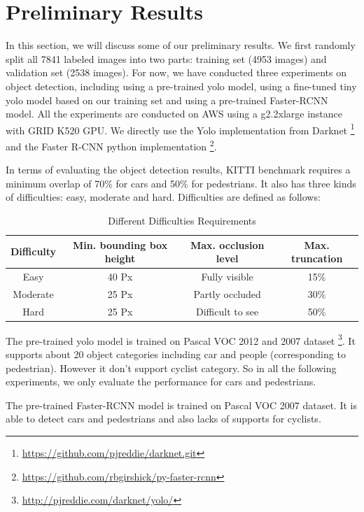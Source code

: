 \section{Preliminary Results}

In this section, we will discuss some of our preliminary results. 
We first randomly split all 7841 labeled images into two parts: 
training set (4953 images) and validation set (2538 images). 
For now, we have conducted three experiments on object detection, including using a pre-trained yolo model, using a fine-tuned tiny yolo model based on our training set and using a pre-trained Faster-RCNN model. All the experiments are conducted on AWS using a g2.2xlarge instance with GRID K520 GPU. We directly use the Yolo implementation from Darknet \footnote{\url{https://github.com/pjreddie/darknet.git}} and the Faster R-CNN python implementation \footnote{\url{https://github.com/rbgirshick/py-faster-rcnn}}.

In terms of evaluating the object detection results, KITTI benchmark requires a minimum overlap of 70\% for cars and 50\% for pedestrians. It also has three kinds of difficulties: easy, moderate and hard. Difficulties are defined as follows:

\begin{table}[h!]
\centering
\begin{tabular}{ c | c | c | c }
\hline
Difficulty & Min. bounding box height & Max. occlusion level & Max. truncation \\
\hline \hline
Easy & 40 Px & Fully visible & 15\% \\
Moderate & 25 Px & Partly occluded & 30\% \\
Hard & 25 Px & Difficult to see & 50\% \\
\hline
\end{tabular}
\caption{Different Difficulties Requirements}
\end{table}

The pre-trained yolo model is trained on Pascal VOC 2012 and 2007 dataset \footnote{\url{http://pjreddie.com/darknet/yolo/}}. It supports about 20 object categories including car and people (corresponding to pedestrian). However it don't support cyclist category. So in all the following experiments, we only evaluate the performance for cars and pedestrians.


The pre-trained Faster-RCNN model is trained on Pascal VOC 2007 dataset. It is able to detect cars and pedestrians and also lacks of supports for cyclists.

